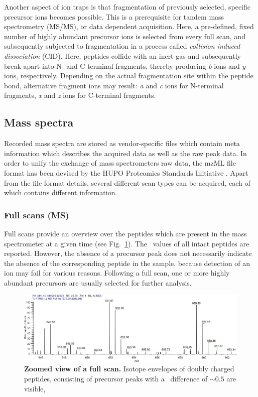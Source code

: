 Another aspect of ion traps is that fragmentation of previously selected,
specific precursor ions becomes possible.
This is a prerequisite for tandem mass spectrometry (MS/MS), or data dependent
acquisition.
Here, a pre-defined, fixed number of highly abundant precursor ions is selected
from every full scan, and subsequently subjected to fragmentation
in a process called {\em collision induced dissociation} (CID).
Here, peptides collide with an inert gas and subsequently break apart into 
N- and C-terminal fragments, thereby producing {\em b} ions and {\em y} ions, 
respectively. 
Depending on the actual fragmentation site within the peptide bond,
alternative fragment ions may result: {\em a} and {\em c} ions for N-terminal
fragments, {\em x} and {\em z} ions for C-terminal fragments.

\subsection{Mass spectra}

Recorded mass spectra are stored as vendor-specific files which contain meta 
information which describes the acquired data as well as the raw peak data.
In order to unify the exchange of mass spectrometers raw data, the mzML file 
format has been devised by the HUPO Proteomics Standards Initiative
\citep{Deutsch2008}.
Apart from the file format details, several different scan types can be
acquired, each of which contains different information.

\subsubsection{Full scans (MS)}

Full scans provide an overview over the peptides which are present in the
mass spectrometer at a given time (see Fig.~\ref{fig:full-scan}).
The \mz~values of all intact peptides are reported.
However, the absence of a precursor peak does not necessarily indicate the
absence of the corresponding peptide in the sample, because detection of
an ion may fail for various reasons.
Following a full scan, one or more highly abundant precursors are usually
selected for further analysis.

\begin{figure}[h]
\includegraphics[width=\textwidth]{figures/ms1-scan.jpg}
\caption{
{\bf Zoomed view of a full scan.}
Isotope envelopes of doubly charged peptides, consisting of precursor
peaks with a \mz~difference of $\sim0.5$ are visible,
}
\label{fig:full-scan}
\end{figure}


